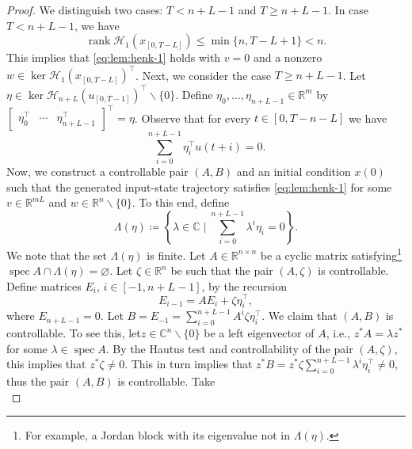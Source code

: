 \documentclass[journal,twoside,web]{ieeecolor}
\DeclareMathOperator{\rank}{rank}
\DeclareMathOperator{\spec}{spec}
\newcommand{\set}[2]{\left\{#1 \mid #2\right\}}
\begin{document}
\begin{proof}
We distinguish two cases: $T<n+L-1$ and \mbox{$T\geq n+L-1$}. In case $T<n+L-1$, we have
\begin{equation}
\rank\mathcal{H}_1(x_{[0,T-L]})\leq \min\{n,T-L+1\}<n.
\end{equation}
This implies that \eqref{eq:lem:henk-1} holds with $v=0$ and a nonzero \mbox{$w\in\ker\mathcal{H}_1(x_{[0,T-L]})^\top$}. Next, we consider the case \mbox{$T\geq n+L-1$}. Let $\eta\in\ker \mathcal{H}_{n+L}(u_{[0,T-1]})^\top\backslash\{0\}$.
Define $\eta_0,\ldots,\eta_{n+L-1}\in\mathbb{R}^m$ by $\begin{bmatrix}
\eta_0^\top & \cdots & \eta_{n+L-1}^\top
\end{bmatrix}^\top=\eta$. Observe that for every $t\in[0,T-n-L]$ we have
\begin{equation}
\label{eq:ker2}
\sum_{i=0}^{n+L-1}\eta_i^\top u(t+i)=0.
\end{equation}
Now, we construct a controllable pair $(A,B)$ and an initial condition $x(0)$ such that the generated input-state trajectory satisfies \eqref{eq:lem:henk-1} for some $v\in\mathbb{R}^{mL}$ and $w\in\mathbb{R}^n\backslash\{0\}$. To this end, define
\begin{equation}
\label{eq:Lambda}
\Lambda(\eta)\coloneqq\set{\lambda\in\mathbb{C}}{\textstyle\sum_{i=0}^{n+L-1}\lambda^i \eta_i=0}.
\end{equation}
We note that the set $\Lambda(\eta)$ is finite. Let $A\in\mathbb{R}^{n\times n}$ be a cyclic matrix satisfying\footnote{For example, a Jordan block with its eigenvalue not in $\Lambda(\eta)$.} $\spec A\cap\Lambda(\eta)=\varnothing$. Let $\zeta\in\mathbb{R}^n$ be such that the pair $(A,\zeta)$ is controllable. Define matrices $E_i$, \mbox{$i\in[-1,n+L-1]$}, by the recursion
\begin{equation}
\label{eq:Ei_recursive}
E_{i-1}=AE_{i}+\zeta\eta_i^\top,
\end{equation}
where $E_{n+L-1}=0$. Let $B=E_{-1}=\sum_{i=0}^{n+L-1}A^i\zeta\eta_i^\top$. We claim that $(A,B)$ is controllable. To see this, let\linebreak $z\in\mathbb{C}^n\backslash \{0\}$ be a left eigenvector of $A$, i.e., $z^*A=\lambda z^*$ for some $\lambda\in\spec A$. By the Hautus test and controllability of the pair $(A,\zeta)$, this implies that $z^*\zeta\neq 0$. This in turn implies that $z^* B=z^* \zeta\sum_{i=0}^{n+L-1} \lambda^i \eta_i^\top\neq 0$, thus the pair $(A,B)$ is controllable. Take
\begin{equation}
\label{eq:x(0)}

\end{equation}
\end{proof}
\end{document}

